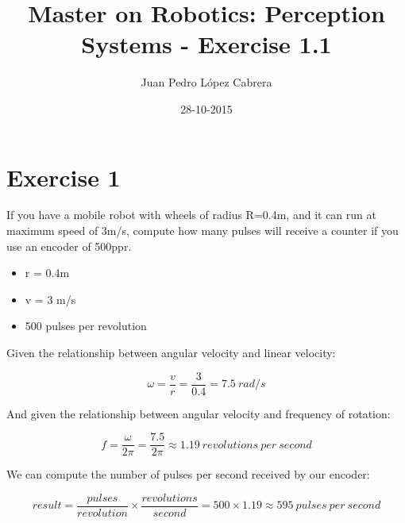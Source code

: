 \documentclass[a4paper]{article}
\title{Master on Robotics: Perception Systems - Exercise 1.1}
\date{28-10-2015}
\author{Juan Pedro López Cabrera}
\begin{document}
  \maketitle

  \newpage

  \section{Exercise 1}
If you have a mobile robot with wheels of radius R=0.4m, and it can run at maximum speed of 3m/s, compute how many pulses will
receive a counter if you use an encoder of 500ppr.
  \begin{itemize}
    \item r = 0.4m
    \item v = 3 m/s
    \item 500 pulses per revolution
  \end{itemize}


Given the relationship between angular velocity and linear velocity:

  \begin{equation}
  {\omega} = \dfrac {v}{r} = \dfrac {3}{0.4} = {7.5}\ {rad/s}
  \end{equation}


And given the relationship between angular velocity and frequency of rotation:

  \begin{equation}
  {f} = \dfrac {\omega}{2\pi} = \dfrac {7.5}{2\pi} \approx {1.19}\ {revolutions\ per\ second}
  \end{equation}


We can compute the number of pulses per second received by our encoder:

  \begin{equation}
  {result} = \dfrac {pulses}{revolution} \times \dfrac {revolutions}{second} = 500 \times 1.19 \approx {595}\ {pulses\ per\ second}
  \end{equation}
\end{document}
